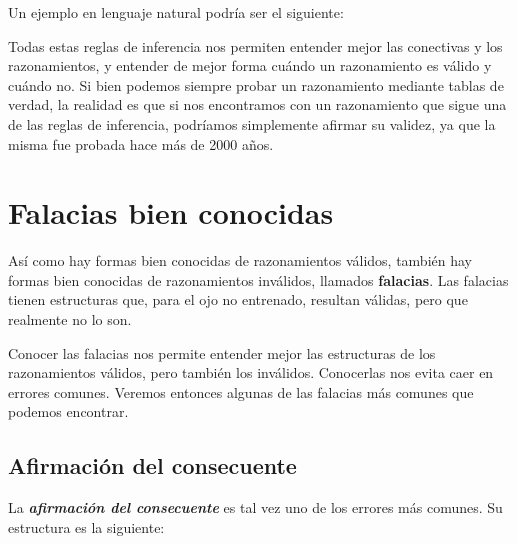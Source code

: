 Un ejemplo en lenguaje natural podría ser el siguiente:

\begin{minipage}{0.5\textwidth}
    \begin{lreasoning}
    \end{lreasoning}
\end{minipage}

Todas estas reglas de inferencia nos permiten entender mejor las conectivas y
los razonamientos, y entender de mejor forma cuándo un razonamiento es válido y
cuándo no. Si bien podemos siempre probar un razonamiento mediante tablas de
verdad, la realidad es que si nos encontramos con un razonamiento que sigue una
de las reglas de inferencia, podríamos simplemente afirmar su validez, ya que la
misma fue probada hace más de 2000 años.

\section{Falacias bien conocidas}
\label{chap:logica_proposicional:sec:falacias}

Así como hay formas bien conocidas de razonamientos válidos, también hay formas
bien conocidas de razonamientos inválidos, llamados \textbf{falacias}. Las
falacias tienen estructuras que, para el ojo no entrenado, resultan válidas,
pero que realmente no lo son.

Conocer las falacias nos permite entender mejor las estructuras de los
razonamientos válidos, pero también los inválidos. Conocerlas nos evita caer en
errores comunes. Veremos entonces algunas de las falacias más comunes que
podemos encontrar.

\subsection{Afirmación del consecuente}

La \textit{\textbf{afirmación del consecuente}} es tal vez uno de los errores
más comunes. Su estructura es la siguiente:

\begin{minipage}{0.3\textwidth}
    \begin{lreasoning}
        \lpremise{$\Phi \lthen \Psi$}
        \lpremise{$\Psi$}
        \lconclusion{$\Phi$}
    \end{lreasoning}
\end{minipage}

